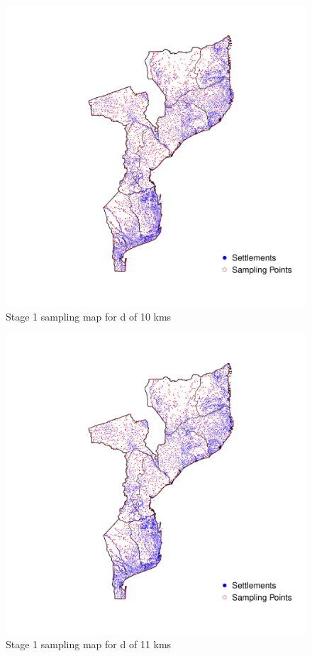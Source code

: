 \documentclass[
  12pt,
  a4paper]{article}
\begin{document}
\begin{figure}[H]

{\centering \includegraphics{mozambiqueNotes_files/figure-latex/stage1plot10-1} 

}

\caption{Stage 1 sampling map for d of 10 kms}\label{fig:stage1plot10}
\end{figure}

\begin{figure}[H]

{\centering \includegraphics{mozambiqueNotes_files/figure-latex/stage1plot11-1} 

}

\caption{Stage 1 sampling map for d of 11 kms}\label{fig:stage1plot11}
\end{figure}
\end{document}
